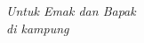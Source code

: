 \acknowledgment
\begin{centering}
\vfill
\emph{Untuk Emak dan Bapak\\di kampung\\[.5cm]}
\vfill
\end{centering}
